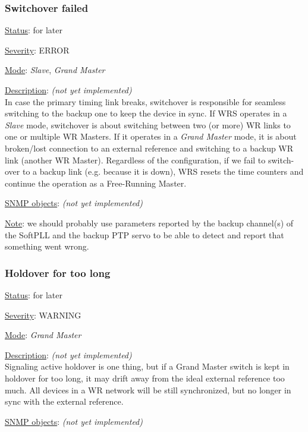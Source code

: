 \subsubsection{\bf Switchover failed}
		\begin{packed_enum}
			\item [] \underline{Status}: for later
			\item [] \underline{Severity}: ERROR
			\item [] \underline{Mode}: \emph{Slave}, \emph{Grand Master}
			\item [] \underline{Description}: \emph{(not yet implemented)}\\
				In case the primary timing link breaks, switchover is responsible for
				seamless switching to the backup one to keep the device in sync. If WRS
				operates in a \emph{Slave} mode, switchover is about switching
				between two (or more) WR links to one or multiple WR Masters. If it
				operates in a \emph{Grand Master} mode, it is about broken/lost
				connection to an external reference and switching to a backup WR link
				(another WR Master). Regardless of the configuration, if we fail to
				switch-over to a backup link (e.g. because it is down), WRS resets
				the time counters and continue the operation as a Free-Running Master.
			\item [] \underline{SNMP objects}: \emph{(not yet implemented)}
			\item [] \underline{Note}: we should probably use parameters reported by
				the backup channel(s) of the SoftPLL and the backup PTP servo to be able
				to detect and report that something went wrong.
		\end{packed_enum}

\subsubsection{\bf Holdover for too long}
		\begin{packed_enum}
			\item [] \underline{Status}: for later
			\item [] \underline{Severity}: WARNING
			\item [] \underline{Mode}: \emph{Grand Master}
			\item [] \underline{Description}: \emph{(not yet implemented)}\\
				Signaling active holdover is one thing, but if a Grand Master switch is
				kept in holdover for too long, it may drift away from the ideal external
				reference too much. All devices in a WR network will be still
				synchronized, but no longer in sync with the external reference.
			\item [] \underline{SNMP objects}: \emph{(not yet implemented)}
		\end{packed_enum}

